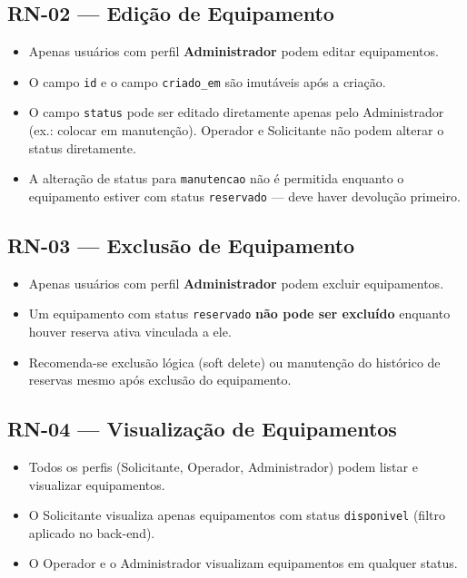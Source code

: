 \documentclass[12pt,a4paper]{article}
\begin{document}
\subsection{RN-02 — Edição de Equipamento}
\begin{itemize}
  \item Apenas usuários com perfil \textbf{Administrador} podem editar equipamentos.
  \item O campo \texttt{id} e o campo \texttt{criado\_em} são imutáveis após a criação.
  \item O campo \texttt{status} pode ser editado diretamente apenas pelo Administrador
        (ex.: colocar em manutenção). Operador e Solicitante não podem alterar o status
        diretamente.
  \item A alteração de status para \texttt{manutencao} não é permitida enquanto o
        equipamento estiver com status \texttt{reservado} — deve haver devolução primeiro.
\end{itemize}

\subsection{RN-03 — Exclusão de Equipamento}
\begin{itemize}
  \item Apenas usuários com perfil \textbf{Administrador} podem excluir equipamentos.
  \item Um equipamento com status \texttt{reservado} \textbf{não pode ser excluído}
        enquanto houver reserva ativa vinculada a ele.
  \item Recomenda-se exclusão lógica (soft delete) ou manutenção do histórico de reservas
        mesmo após exclusão do equipamento.
\end{itemize}

\subsection{RN-04 — Visualização de Equipamentos}
\begin{itemize}
  \item Todos os perfis (Solicitante, Operador, Administrador) podem listar e visualizar
        equipamentos.
  \item O Solicitante visualiza apenas equipamentos com status \texttt{disponivel}
        (filtro aplicado no back-end).
  \item O Operador e o Administrador visualizam equipamentos em qualquer status.
\end{itemize}
\end{document}
